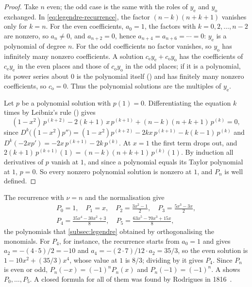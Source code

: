 \begin{proof}
Take $n$ even; the odd case is the same with the roles of $y_{\mathrm e}$ and $y_{\mathrm o}$ exchanged. In \eqref{eq:legendre-recurrence}, the factor $(n-k)(n+k+1)$ vanishes only for $k=n$. For the even coefficients, $a_0=1$, the factors with $k=0,2,\ldots,n-2$ are nonzero, so $a_n\ne0$, and $a_{n+2}=0$, hence $a_{n+4}=a_{n+6}=\cdots=0$: $y_{\mathrm e}$ is a polynomial of degree $n$. For the odd coefficients no factor vanishes, so $y_{\mathrm o}$ has infinitely many nonzero coefficients. A solution $c_{\mathrm e}y_{\mathrm e}+c_{\mathrm o}y_{\mathrm o}$ has the coefficients of $c_{\mathrm e}y_{\mathrm e}$ in the even places and those of $c_{\mathrm o}y_{\mathrm o}$ in the odd places; if it is a polynomial, its power series about $0$ is the polynomial itself () and has finitely many nonzero coefficients, so $c_{\mathrm o}=0$. Thus the polynomial solutions are the multiples of $y_{\mathrm e}$.

Let $p$ be a polynomial solution with $p(1)=0$. Differentiating the equation $k$ times by Leibniz's rule () gives
\[
(1-x^2)\,p^{(k+2)}-2(k+1)\,x\,p^{(k+1)}+(n-k)(n+k+1)\,p^{(k)}=0 ,
\]
since $D^k\bigl((1-x^2)p''\bigr)=(1-x^2)p^{(k+2)}-2kx\,p^{(k+1)}-k(k-1)\,p^{(k)}$ and $D^k(-2xp')=-2x\,p^{(k+1)}-2k\,p^{(k)}$. At $x=1$ the first term drops out, and $2(k+1)\,p^{(k+1)}(1)=(n-k)(n+k+1)\,p^{(k)}(1)$. By induction all derivatives of $p$ vanish at $1$, and since a polynomial equals its Taylor polynomial at $1$, $p=0$. So every nonzero polynomial solution is nonzero at $1$, and $P_n$ is well defined.
\end{proof}

The recurrence with $\nu=n$ and the normalisation give
\begin{gather*}
P_0=1,\quad P_1=x,\quad P_2=\frac{3x^2-1}2,\quad P_3=\frac{5x^3-3x}2,\\
P_4=\frac{35x^4-30x^2+3}8,\quad P_5=\frac{63x^5-70x^3+15x}8 ,
\end{gather*}
the polynomials that \cref{subsec:legendre} obtained by orthogonalising the monomials. For $P_4$, for instance, the recurrence starts from $a_0=1$ and gives $a_2=-(4\cdot5)/2=-10$ and $a_4=-(2\cdot7)/12\cdot a_2=35/3$, so the even solution is $1-10x^2+(35/3)x^4$, whose value at $1$ is $8/3$; dividing by it gives $P_4$. Since $P_n$ is even or odd, $P_n(-x)=(-1)^nP_n(x)$ and $P_n(-1)=(-1)^n$. A shows $P_0,\ldots,P_5$. A closed formula for all of them was found by Rodrigues in 1816~\cite{rodrigues1816}.

